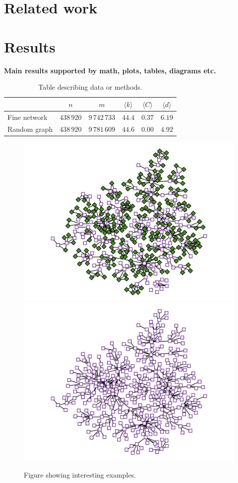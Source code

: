 \documentclass[9pt,twocolumn,twoside]{pnas-report}
\begin{document}
\section*{Related work}



\nocite{Kle00,Bou05,EB07,New08,For10,New12,FH16,PLC17,PDL18,Pei20}

\section*{Results}

 {\bf Main results supported by math, plots, tables, diagrams etc.}
\lipsum[1]

\begin{table}[h]\centering%
	\caption{Table describing data or methods.}
	\begin{tabular}{lccccc}\toprule
		             & $n$        & $m$           & $\langle k\rangle$ & $\langle C\rangle$ & $\langle d\rangle$ \\\midrule
		Fine network & $438\,920$ & $9\,742\,733$ & $44.4$             & $0.37$             & $6.19$             \\
		Random graph & $438\,920$ & $9\,781\,609$ & $44.6$             & $0.00$             & $4.92$             \\\bottomrule
	\end{tabular}
	\label{tbl:example}
\end{table}

\lipsum[2-3]

\begin{figure}[t]\centering%
	\includegraphics[width=0.49\linewidth]{example1}
	\includegraphics[width=0.49\linewidth]{example2}
	\caption{Figure showing interesting examples.~\cite{Sub18a}}
\end{figure}
\end{document}
